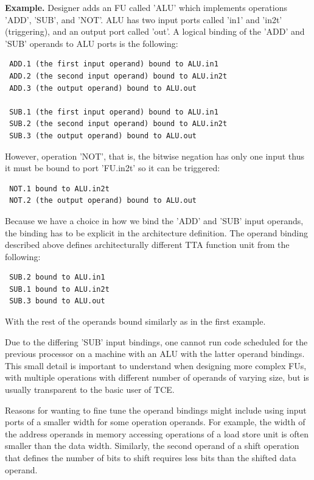 \documentclass[a4paper,twoside]{tceusermanual}
\begin{document}
\textbf{Example.} Designer adds an FU called 'ALU' which implements
operations 'ADD', 'SUB', and 'NOT'. ALU has two input ports called 'in1' and 
'in2t' (triggering), and an output port called 'out'. A logical binding of 
the 'ADD' and 'SUB' operands to ALU ports is the following:

\begin{verbatim}
 ADD.1 (the first input operand) bound to ALU.in1
 ADD.2 (the second input operand) bound to ALU.in2t
 ADD.3 (the output operand) bound to ALU.out

 SUB.1 (the first input operand) bound to ALU.in1
 SUB.2 (the second input operand) bound to ALU.in2t
 SUB.3 (the output operand) bound to ALU.out
\end{verbatim}

However, operation 'NOT', that is, the bitwise negation has only one input
thus it must be bound to port 'FU.in2t' so it can be triggered:

\begin{verbatim}
 NOT.1 bound to ALU.in2t
 NOT.2 (the output operand) bound to ALU.out
\end{verbatim}

Because we have a choice in how we bind the 'ADD' and 'SUB' input operands,
the binding has to be explicit in the architecture definition. The operand
binding described above defines architecturally different TTA function unit
from the following:

\begin{verbatim}
 SUB.2 bound to ALU.in1
 SUB.1 bound to ALU.in2t
 SUB.3 bound to ALU.out
\end{verbatim}

With the rest of the operands bound similarly as in the first example.

Due to the differing 'SUB' input bindings, one cannot run code scheduled
for the previous processor on a machine with an ALU with the latter 
operand bindings. This small detail is important to understand when 
designing more complex FUs, with multiple operations with different number of 
operands of varying size, but is usually transparent to the basic user of 
TCE.

Reasons for wanting to fine tune the operand bindings might include using
input ports of a smaller width for some operation operands. For example, the 
width of the address operands in memory accessing operations of a load store 
unit is often smaller than the data width. Similarly, the second operand of
a shift operation that defines the number of bits to shift requires less
bits than the shifted data operand.
\end{document}
